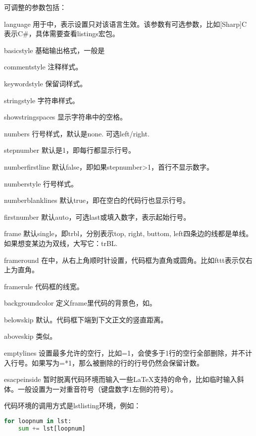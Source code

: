 可调整的参数包括：
\begin{para}
\item[language] 用于\latexline{\\lstset}中，表示设置只对该语言生效。该参数有可选参数，比如[Sharp]C表示C\#，具体需要查看listings宏包。
\item[basicstyle] 基础输出格式，一般是\latexline{\\small\\ttfamily}
\item[commentstyle] 注释样式。
\item[keywordstyle] 保留词样式。
\item[stringstyle] 字符串样式。
\item[showstringspaces] 显示字符串中的空格。
\item[numbers] 行号样式，默认是none. 可选left/right.
\item[stepnumber] 默认是1，即每行都显示行号。
\item[numberfirstline] 默认false，即如果stepnumber>1，首行不显示数字。
\item[numberstyle] 行号样式。
\item[numberblanklines] 默认true，即在空白的代码行也显示行号。
\item[firstnumber] 默认auto，可选last或填入数字，表示起始行号。
\item[frame] 默认single，即trbl，分别表示top, right, buttom, left四条边的线都是单线。如果想变某边为双线，大写它：trBL.
\item[frameround] 在\latexline{\\lstset}中，从右上角顺时针设置，代码框为直角或圆角。比如fttt表示仅右上为直角。
\item[framerule] 代码框的线宽。
\item[backgroundcolor] 定义frame里代码的背景色，如\latexline{\\color{red}}。
\item[belowskip] 默认\latexline{\\medskipamount}。代码框下端到下文正文的竖直距离。
\item[aboveskip] 类似。
\item[emptylines] 设置最多允许的空行，比如=1，会使多于1行的空行全部删除，并不计入行号。如果写为=*1，那么被删除的行的行号仍然会保留计数。
\item[esacpeinside] 暂时脱离代码环境而输入一些\LaTeX 支持的命令，比如临时输入斜体。一般设置为一对重音符号（键盘数字1左侧的符号）。
\end{para}

代码环境的调用方式是lstlisting环境，例如：
\begin{latex}{}
\begin{lstlisting}[language=Python]
for loopnum in lst:
    sum += lst[loopnum]
\end{lstlisting}
\end{latex}

